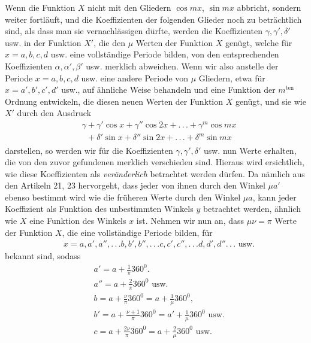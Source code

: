 \begingroup
\renewcommand{\arraystretch}{1.45}
Wenn die Funktion $X$ nicht mit den Gliedern $\cos mx$, $\sin mx$ abbricht, sondern weiter fortläuft, und die Koeffizienten der folgenden Glieder noch zu beträchtlich sind, als dass man sie vernachlässigen dürfte, werden die Koeffizienten $\gamma,\gamma',\delta'$ usw. in der Funktion $X'$, die den $\mu$ Werten der Funktion $X$ genügt, welche für $x=a,b,c,d$ usw. eine vollständige Periode bilden, von den entsprechenden Koeffizienten $\alpha,\alpha',\beta'$ usw. merklich abweichen. Wenn wir also anstelle der Periode $x=a,b,c,d$ usw. eine andere Periode von $\mu$ Gliedern, etwa für $x=a',b',c',d'$ usw., auf ähnliche Weise behandeln und eine Funktion der $m^{\mathrm{ten}}$ Ordnung entwickeln, die diesen neuen Werten der Funktion $X$ genügt, und sie wie $X'$ durch den Ausdruck
\[
\begin{aligned}
&\gamma+\gamma'\cos x+\gamma''\cos2x+.\,.\,.+\gamma^m\cos mx\\[5pt]
&\phantom{\gamma}+\delta'\sin x+\delta''\sin2x+.\,.\,.+\delta^m\sin mx
\end{aligned}
\]
darstellen, so werden wir für die Koeffizienten $\gamma,\gamma',\delta'$ usw. nun Werte erhalten, die von den zuvor gefundenen merklich verschieden sind. Hieraus wird ersichtlich, wie diese Koeffizienten als \textit{veränderlich} betrachtet werden dürfen. Da nämlich aus den Artikeln 21, 23 hervorgeht, dass jeder von ihnen durch den Winkel $\mu a'$ ebenso bestimmt wird wie die früheren Werte durch den Winkel $\mu a$, kann jeder Koeffizient als Funktion des unbestimmten Winkels $y$ betrachtet werden, ähnlich wie $X$ eine Funktion des Winkels $x$ ist. 
Nehmen wir nun an, dass $\mu\nu=\pi$ Werte der Funktion $X$, die eine vollständige Periode bilden, für
\[
\begin{aligned}
&x=a,a',a'',.\,.\,.b,b',b'',.\,.\,.c,c',c'',.\,.\,.d,d',d''.\,.\,.\text{ usw.}
\end{aligned}
\]
bekannt sind, sodass
\[
\begin{aligned}
&a'=a+\tfrac1\pi360^0.\\[5pt]
&a''=a+\tfrac2\pi360^0\text{ usw.}\\[5pt]
&b=a+\tfrac\nu\pi360^0=a+\tfrac1\mu360^0,\\[5pt]
&b'=a+\tfrac{\nu+1}\pi360^0=a'+\tfrac1\mu360^0\text{ usw.}\\[5pt]
&c=a+\tfrac{2\nu}\pi360^0=a+\tfrac2\mu360^0\text{ usw.}
\end{aligned}
\]
